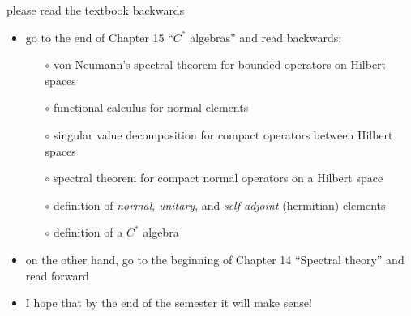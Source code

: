 \documentclass[10pt,hyperref]{beamer}
\begin{document}
\begin{frame}{please read the textbook backwards}

\begin{itemize}
\item go to the end of Chapter 15 ``$C^*$ algebras'' and read backwards:
    \begin{itemize}
    \item[$\circ$] von Neumann's spectral theorem for bounded operators on Hilbert spaces
    \item[$\circ$] functional calculus for normal elements
    \item[$\circ$] singular value decomposition for compact operators between Hilbert spaces
    \item[$\circ$] spectral theorem for compact normal operators on a Hilbert space
    \item[$\circ$] definition of \emph{normal}, \emph{unitary}, and \emph{self-adjoint} (hermitian) elements
    \item[$\circ$] definition of a $C^*$ algebra
    \end{itemize}
\item on the other hand, go to the beginning of Chapter 14 ``Spectral theory'' and read forward
\item I hope that by the end of the semester it will make sense!
\end{itemize}
\end{frame}
\end{document}
